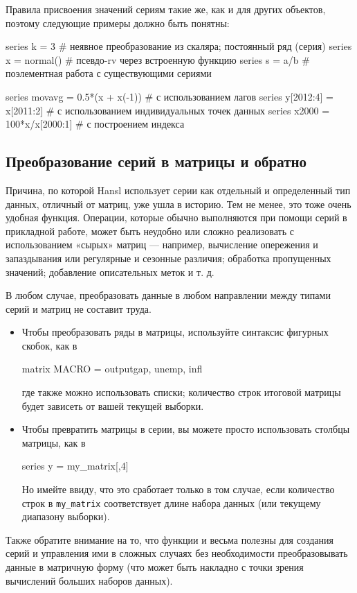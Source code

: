Правила присвоения значений сериям такие же, как и для других
объектов, поэтому следующие примеры должно быть понятны:
\begin{code}
  series k = 3         # неявное преобразование из скаляра; постоянный ряд (серия)
  series x = normal()  # псевдо-rv через встроенную функцию
  series s = a/b       # поэлементная работа с существующими сериями

  series movavg = 0.5*(x + x(-1)) # с использованием лагов
  series y[2012:4] = x[2011:2]    # с использованием индивидуальных точек данных
  series x2000 = 100*x/x[2000:1]  # с построением индекса
\end{code}


\subsection{Преобразование серий в матрицы и обратно}

Причина, по которой Hansl использует серии как отдельный и
определенный тип данных, отличный от матриц, уже ушла в историю. Тем
не менее, это тоже очень удобная функция. Операции, которые обычно
выполняются при помощи серий в прикладной работе, может быть неудобно
или сложно реализовать с использованием «сырых» матриц --- например,
вычисление опережения и запаздывания или регулярные и сезонные
различия; обработка пропущенных значений; добавление описательных
меток и т. д.

В любом случае, преобразовать данные в любом направлении между типами
серий и матриц не составит труда.

\begin{itemize}
\item Чтобы преобразовать ряды в матрицы, используйте синтаксис
  фигурных скобок, как в
  \begin{code}
    matrix MACRO = {outputgap, unemp, infl}
  \end{code}
  где также можно использовать списки; количество строк итоговой
  матрицы будет зависеть от вашей текущей выборки.
\item Чтобы превратить матрицы в серии, вы можете просто использовать
  столбцы матрицы, как в
  \begin{code}
    series y = my_matrix[,4]
  \end{code}
  Но имейте ввиду, что это сработает только в том случае, если
  количество строк в \texttt{my\_matrix} соответствует длине набора
  данных (или текущему диапазону выборки).
\end{itemize}
Также обратите внимание на то, что функции  и
 весьма полезны для создания серий и управления ими в
сложных случаях без необходимости преобразовывать данные в матричную
форму (что может быть накладно с точки зрения вычислений больших
наборов данных).

